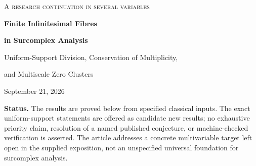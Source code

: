 \documentclass[11pt,letterpaper]{article}
\theoremstyle{definition}
\theoremstyle{remark}
\newcommand{\C}{\mathbb C}
\newcommand{\A}{\mathscr A}
\numberwithin{equation}{section}
\begin{document}
\begin{titlepage}
\centering
\vspace*{0.7cm}
{\large\scshape A research continuation in several variables\par}
\vspace{0.75cm}
{\Huge\bfseries Finite Infinitesimal Fibres\par}
\vspace{0.28cm}
{\LARGE\bfseries in Surcomplex Analysis\par}
\vspace{0.6cm}
{\Large Uniform-Support Division, Conservation of Multiplicity,\par and Multiscale Zero Clusters\par}
\vspace{0.7cm}
{\large September 21, 2026\par}
\vspace{0.65cm}
\begin{minipage}{0.94\textwidth}
\begin{abstract}
An isolated zero of a system of complex analytic equations has a finite intersection multiplicity. We prove that this entire multiplicity survives arbitrary positive-support Hahn perturbations, even when the perturbation uses an arbitrary-rank ordered group and contains scales smaller than every power of another infinitesimal.

The correct algebra is
\[
 \A_{n,\Gamma}=\C[[z_1,\ldots,z_n]]((t^\Gamma)),
\]
with one well-ordered Hahn support shared by all Taylor coefficients. If the leading system $f_1,\ldots,f_n$ has colength $\mu$, then every perturbation $F_i=f_i+E_i$ of strictly positive Hahn support has a quotient of dimension exactly $\mu$ over $K=\C((t^\Gamma))$. Any chosen polynomial basis of the leading quotient remains a basis. We construct division and syzygy operators with explicit support bounds, identify all maximal ideals with actual infinitesimal zeros, and identify their local lengths with fine-analytic intersection multiplicities. Consequently every infinitesimal target has exactly $\mu$ preimages counted with multiplicity.

For monomial leading systems, the division construction preserves a prescribed ordinary polydisk and arbitrary ordinary holomorphic parameters. A coefficientwise torus residue gives a perfect pairing on the resulting finite free algebra. A coupled two-variable example exhibits a triple collision split at a second, infinitely smaller scale, together with exact cancellation of large local residue contributions.
\end{abstract}
\end{minipage}
\vfill
\begin{minipage}{0.94\textwidth}\small
\textbf{Status.} The results are proved below from specified classical inputs. The exact uniform-support statements are offered as candidate new results; no exhaustive priority claim, resolution of a named published conjecture, or machine-checked verification is asserted. The article addresses a concrete multivariable target left open in the supplied exposition, not an unspecified universal foundation for surcomplex analysis.
\end{minipage}
\end{titlepage}
\end{document}
